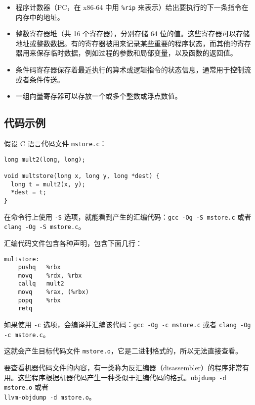 \begin{itemize}
    \item 程序计数器（PC，在 x86-64 中用 \verb|%rip| 来表示）给出要执行的下一条指令在内存中的地址。
    \item 整数寄存器堆（共 16 个寄存器），分别存储 64 位的值。这些寄存器可以存储地址或整数数据。有的寄存器被用来记录某些重要的程序状态，而其他的寄存器用来保存临时数据，例如过程的参数和局部变量，以及函数的返回值。
    \item 条件码寄存器保存着最近执行的算术或逻辑指令的状态信息，通常用于控制流或者条件传送。
    \item 一组向量寄存器可以存放一个或多个整数或浮点数值。
\end{itemize}

\subsection{代码示例}

假设 C 语言代码文件 \verb|mstore.c|：

\begin{verbatim}
long mult2(long, long);

void multstore(long x, long y, long *dest) {
  long t = mult2(x, y);
  *dest = t;
}
\end{verbatim}

在命令行上使用 \verb|-S| 选项，就能看到产生的汇编代码：\verb|gcc -Og -S mstore.c| 或者 \verb|clang -Og -S mstore.c|。

汇编代码文件包含各种声明，包含下面几行：

\begin{verbatim}
multstore:
    pushq   %rbx
    movq    %rdx, %rbx
    callq   mult2
    movq    %rax, (%rbx)
    popq    %rbx
    retq
\end{verbatim}

如果使用 \verb|-c| 选项，会编译并汇编该代码：\verb|gcc -Og -c mstore.c| 或者 \verb|clang -Og -c mstore.c|。

这就会产生目标代码文件 \verb|mstore.o|，它是二进制格式的，所以无法直接查看。


要查看机器代码文件的内容，有一类称为反汇编器（disassembler）的程序非常有用。这些程序根据机器代码产生一种类似于汇编代码的格式。\verb|objdump -d mstore.o| 或者\\ \verb|llvm-objdump -d mstore.o|。

